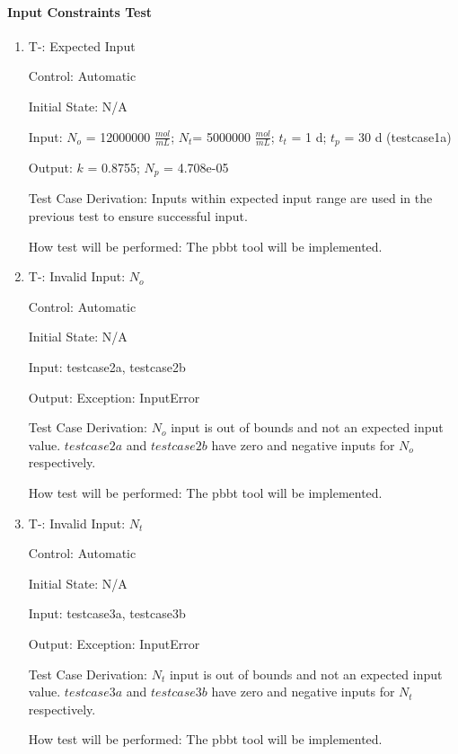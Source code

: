 \documentclass[12pt, titlepage]{article}
\newcounter{tinnum} %
\begin{document}
\paragraph{Input Constraints Test}

\begin{enumerate}

\item{T-}\thetinnum\label{T-1}: Expected Input

Control: Automatic
					
Initial State: N/A
					
Input: $N_{o}$ = 12000000 $\frac{mol}{mL}$; $N_{t}$= 5000000 $\frac{mol}{mL}$; 
$t_{t}$ = 1 d; $t_{p}$ = 30 d (testcase1a)
					
Output: $k$ = 0.8755; $N_p$ = 4.708e-05

Test Case Derivation: Inputs within expected input range are used in the 
previous test to ensure successful input.
					
How test will be performed: The pbbt tool will be implemented.
					
\item{T-}\thetinnum\label{T-2}: Invalid Input: $N_{o}$

Control: Automatic
					
Initial State: N/A
					
Input: testcase2a, testcase2b
					
Output: Exception: InputError

Test Case Derivation: $N_{o}$ input is out of bounds and not an expected input 
value. $testcase2a$ and $testcase2b$ have zero and negative inputs for $N_{o}$  
respectively. 

How test will be performed: The pbbt tool will be implemented.


\item{T-}\thetinnum\label{T-3}: Invalid Input: $N_{t}$

Control: Automatic
					
Initial State: N/A
					
Input: testcase3a, testcase3b
					
Output: Exception: InputError

Test Case Derivation: $N_{t}$ input is out of bounds and not an expected input 
value. $testcase3a$ and $testcase3b$ have zero and negative inputs for $N_{t}$ respectively. 

How test will be performed: The pbbt tool will be implemented.



\end{enumerate}
\end{document}
